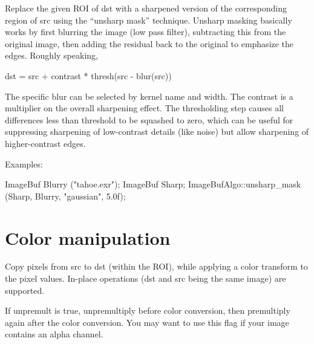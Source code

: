 Replace the given ROI of {\cf dst} with a sharpened version of the
corresponding region of {\cf src} using the ``unsharp mask'' technique.
Unsharp masking basically works by first blurring the image (low
pass filter), subtracting this from the original image, then
adding the residual back to the original to emphasize the edges.
Roughly speaking,

\begin{code}
     dst = src + contrast * thresh(src - blur(src))
\end{code}

The specific blur can be selected by kernel name and width.  The
{\cf contrast} is a multiplier on the overall sharpening effect.  The
thresholding step causes all differences less than {\cf threshold} to be
squashed to zero, which can be useful for suppressing sharpening of
low-contrast details (like noise) but allow sharpening of
higher-contrast edges.

\smallskip
\noindent Examples:
\begin{code}
    ImageBuf Blurry ("tahoe.exr");
    ImageBuf Sharp;
    ImageBufAlgo::unsharp_mask (Sharp, Blurry, "gaussian", 5.0f);
\end{code}
\apiend


\section{Color manipulation}
\label{sec:iba:color}

 
Copy pixels from {\cf src} to {\cf dst} (within the ROI), while
applying a color transform to the pixel values.
In-place operations ({\cf dst} and {\cf src} being the same image)
are supported.

If {\cf unpremult} is {\cf true}, unpremultiply before color conversion,
then premultiply again after the color conversion.  You may want to use
this flag if your image contains an alpha channel.

